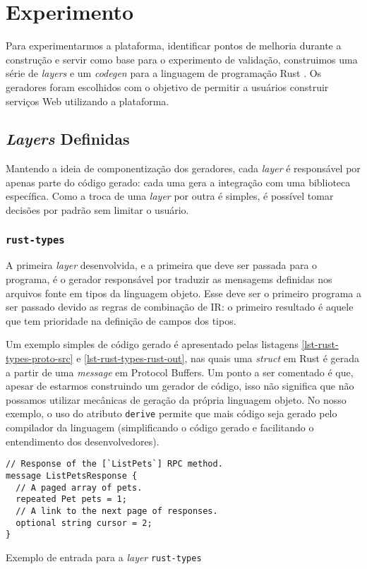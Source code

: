 \section{Experimento}

Para experimentarmos a plataforma, identificar pontos de melhoria durante a construção e
servir como base para o experimento de validação, construimos uma série de \textit{layers} e
um \textit{codegen} para a linguagem de programação Rust \cite{rust:site}. Os geradores foram
escolhidos com o objetivo de permitir a usuários construir serviços Web utilizando a plataforma.

\subsection{\textit{Layers} Definidas}

Mantendo a ideia de componentização dos geradores, cada \textit{layer} é responsável por apenas
parte do código gerado: cada uma gera a integração com uma biblioteca específica. Como a troca
de uma \textit{layer} por outra é simples, é possível tomar decisões por padrão sem limitar o
usuário.

\subsubsection{\texttt{rust-types}}

A primeira \textit{layer} desenvolvida, e a primeira que deve ser passada para o programa, é
o gerador responsável por traduzir as mensagems definidas nos arquivos fonte em tipos da linguagem
objeto. Esse deve ser o primeiro programa a ser passado devido as regras de combinação de IR: o
primeiro resultado é aquele que tem prioridade na definição de campos dos tipos.

Um exemplo simples de código gerado é apresentado pelas listagens \ref{lst-rust-types-proto-src}
e \ref{lst-rust-types-rust-out}, nas quais uma \textit{struct} em Rust é gerada a partir de uma
\textit{message} em Protocol Buffers. Um ponto a ser comentado é que, apesar de estarmos construindo
um gerador de código, isso não significa que não possamos utilizar mecânicas de geração da própria
linguagem objeto. No nosso exemplo, o uso do atributo \texttt{derive} permite que mais código seja
gerado pelo compilador da linguagem (simplificando o código gerado e facilitando o entendimento
dos desenvolvedores).

\begin{listing}
\begin{verbatim}
// Response of the [`ListPets`] RPC method.
message ListPetsResponse {
  // A paged array of pets.
  repeated Pet pets = 1;
  // A link to the next page of responses.
  optional string cursor = 2;
}
\end{verbatim}
\caption{Exemplo de entrada para a \textit{layer} \texttt{rust-types}}
\label{lst-rust-types-proto-src}
\end{listing}


